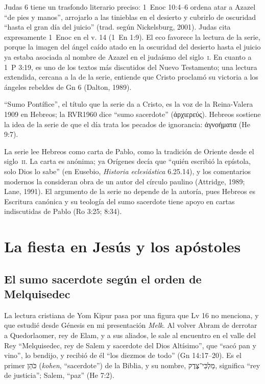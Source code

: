 \documentclass[11pt,letterpaper]{article}
\newcommand{\heb}[1]{\mbox{\foreignlanguage{hebrew}{#1}}}
\newcommand{\grc}[1]{\foreignlanguage{ancientgreek}{#1}}
\begin{document}
\begin{nota}
Judas 6 tiene un trasfondo literario preciso: 1~Enoc 10:4--6 ordena atar a Azazel ``de pies y manos'', arrojarlo a las tinieblas en el desierto y cubrirlo de oscuridad ``hasta el gran día del juicio'' (trad. según Nickelsburg, 2001). Judas cita expresamente 1~Enoc en el v. 14 (1~En 1:9). El eco favorece la lectura de la serie, porque la imagen del ángel caído atado en la oscuridad del desierto hasta el juicio ya estaba asociada al nombre de Azazel en el judaísmo del siglo~\textsc{i}. En cuanto a 1~P 3:19, es uno de los textos más discutidos del Nuevo Testamento; una lectura extendida, cercana a la de la serie, entiende que Cristo proclamó su victoria a los ángeles rebeldes de Gn 6 (Dalton, 1989).
\end{nota}

\begin{nota}
``Sumo Pontífice'', el título que la serie da a Cristo, es la voz de la Reina-Valera 1909 en Hebreos; la RVR1960 dice ``sumo sacerdote'' (\grc{ἀρχιερεύς}). Hebreos sostiene la idea de la serie de que el día trata los pecados de ignorancia: \grc{ἀγνοήματα} (He 9:7).
\end{nota}

\begin{nota}
La serie lee Hebreos como carta de Pablo, como la tradición de Oriente desde el siglo~\textsc{ii}. La carta es anónima; ya Orígenes decía que ``quién escribió la epístola, solo Dios lo sabe'' (en Eusebio, \emph{Historia eclesiástica} 6.25.14), y los comentarios modernos la consideran obra de un autor del círculo paulino (Attridge, 1989; Lane, 1991). El argumento de la serie no depende de la autoría, pues Hebreos es Escritura canónica y su teología del sumo sacerdote tiene apoyo en cartas indiscutidas de Pablo (Ro 3:25; 8:34).
\end{nota}

\section{La fiesta en Jesús y los apóstoles}\label{sec:mesias}

\subsection{El sumo sacerdote según el orden de Melquisedec}
La lectura cristiana de Yom Kipur pasa por una figura que Lv 16 no menciona, y que estudié desde Génesis en mi presentación \emph{Melk}. Al volver Abram de derrotar a Quedorlaomer, rey de Elam, y a sus aliados, le sale al encuentro en el valle del Rey ``Melquisedec, rey de Salem y sacerdote del Dios Altísimo'', que ``sacó pan y vino'', lo bendijo, y recibió de él ``los diezmos de todo'' (Gn 14:17--20). Es el primer \heb{כֹּהֵן} (\emph{kohen}, ``sacerdote'') de la Biblia, y su nombre, \heb{מַלְכִּי־צֶדֶק}, significa ``rey de justicia''; Salem, ``paz'' (He 7:2).
\end{document}
